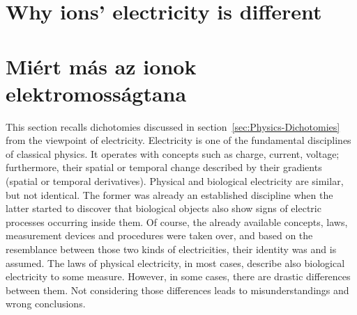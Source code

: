 
\ifx\magyar\undefined

\section[Why different]{Why ions' electricity is different\label{sec:PHYSICS_ElectricWhyDifferent}}

\else

\section[Miért más]{Miért más az ionok elektromosságtana\label{sec:PHYSICS_ElectricWhyDifferent}}

\fi

\ifx\magyar\undefined

This section recalls dichotomies discussed in section~\ref{sec:Physics-Dichotomies} from the viewpoint of electricity.
Electricity is one of the fundamental disciplines of classical physics. It operates with concepts such as charge, current, voltage; furthermore, their
spatial or temporal change described by their gradients (spatial or temporal derivatives).
Physical and biological electricity are similar, but not identical.
The former was already an established discipline when the latter
started to discover that biological objects also show signs of electric processes occurring inside them.
Of course, the already available concepts, laws, measurement devices and procedures were taken over, and based on the resemblance between those two kinds of electricities, their identity was and is assumed.
The laws of physical electricity, in most cases, describe also biological electricity to some measure. 
However, in some cases, there are drastic differences between them.
Not considering those differences leads to misunderstandings and wrong conclusions.
\else

\fi

